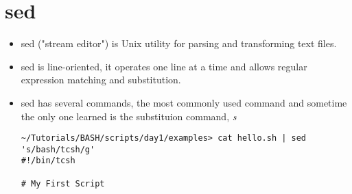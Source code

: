 \documentclass[10pt,t]{beamer}
\begin{document}
\section{sed}
\begin{frame}
  \begin{itemize}
    \item sed ("stream editor") is Unix utility for parsing and transforming text files.
    \item sed is line-oriented, it operates one line at a time and allows regular expression matching and substitution.
    \item sed has several commands, the most commonly used command and sometime the only one learned  is the substituion command, \textit{s}
      \begin{lstlisting}[style=LINUX]
~/Tutorials/BASH/scripts/day1/examples> cat hello.sh | sed 's/bash/tcsh/g'
#!/bin/tcsh

# My First Script


\end{lstlisting}
\end{itemize}
\end{frame}
\end{document}
